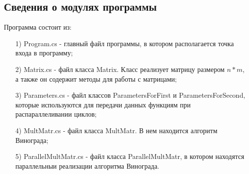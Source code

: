 \documentclass[14pt, a4paper]{extarticle}
\begin{document}
\subsection{Сведения о модулях программы}
Программа состоит из:
\begin{enumerate}
	\item[1)] Program.cs - главный файл программы, в котором располагается точка входа в программу;
	\item[2)] Matrix.cs - файл класса Matrix. Класс реализует матрицу размером $n * m$, а также он содержит методы для работы с матрицами;
	\item[3)] Parameters.cs - файл классов ParametersForFirst и ParametersForSecond, которые используются для передачи данных функциям при распараллеливании циклов;
	\item[4)] MultMatr.cs - файл класса MultMatr. В нем находится алгоритм Винограда;
	\item[5)] ParallelMultMatr.cs - файл класса ParallelMultMatr, в котором находятся параллельныи реализации алгоритма Винограда.
\end{enumerate}
\end{document}
